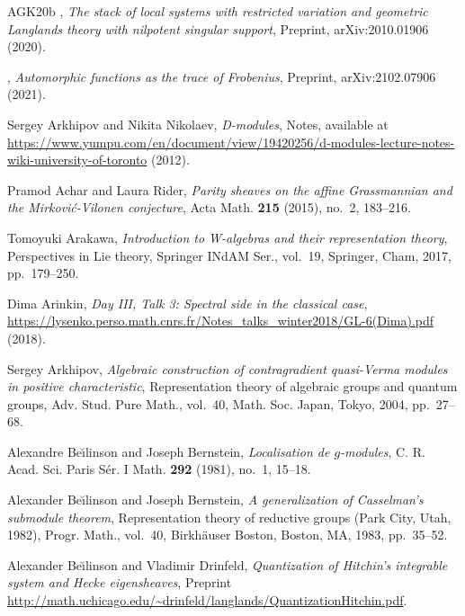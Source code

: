 \begin{thebibliography}{AGK{\etalchar{+}}20b}
\bysame, \emph{The stack of local systems with restricted variation and
  geometric {L}anglands theory with nilpotent singular support}, Preprint,
  arXiv:2010.01906 (2020).

\bysame, \emph{Automorphic functions as the trace of {F}robenius}, Preprint,
  arXiv:2102.07906 (2021).

Sergey Arkhipov and Nikita Nikolaev, \emph{D-modules}, Notes, available at
  \url{https://www.yumpu.com/en/document/view/19420256/d-modules-lecture-notes-wiki-university-of-toronto}
  (2012).

Pramod Achar and Laura Rider, \emph{Parity sheaves on the affine {G}rassmannian
  and the {M}irkovi\'{c}-{V}ilonen conjecture}, Acta Math. \textbf{215} (2015),
  no.~2, 183--216.

Tomoyuki Arakawa, \emph{Introduction to {W}-algebras and their representation
  theory}, Perspectives in {L}ie theory, Springer INdAM Ser., vol.~19,
  Springer, Cham, 2017, pp.~179--250.

Dima Arinkin, \emph{Day {III}, {T}alk 3: {S}pectral side in the classical
  case},
  \url{https://lysenko.perso.math.cnrs.fr/Notes_talks_winter2018/GL-6(Dima).pdf}
  (2018).

Sergey Arkhipov, \emph{Algebraic construction of contragradient quasi-{V}erma
  modules in positive characteristic}, Representation theory of algebraic
  groups and quantum groups, Adv. Stud. Pure Math., vol.~40, Math. Soc. Japan,
  Tokyo, 2004, pp.~27--68.

Alexandre Be\u{\i}linson and Joseph Bernstein, \emph{Localisation de
  {$g$}-modules}, C. R. Acad. Sci. Paris S\'{e}r. I Math. \textbf{292} (1981),
  no.~1, 15--18.

Alexander Be\u{\i}linson and Joseph Bernstein, \emph{A generalization of
  {C}asselman's submodule theorem}, Representation theory of reductive groups
  ({P}ark {C}ity, {U}tah, 1982), Progr. Math., vol.~40, Birkh\"{a}user Boston,
  Boston, MA, 1983, pp.~35--52.

Alexander Be\u{\i}linson and Vladimir Drinfeld, \emph{Quantization of
  {H}itchin's integrable system and {H}ecke eigensheaves}, Preprint
  \url{http://math.uchicago.edu/~drinfeld/langlands/QuantizationHitchin.pdf}.


\end{thebibliography}
